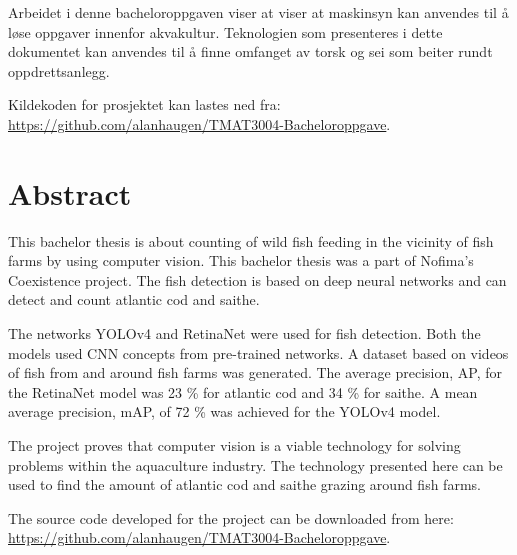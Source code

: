 Arbeidet i denne bacheloroppgaven viser at viser at maskinsyn kan anvendes til å løse oppgaver innenfor akvakultur. Teknologien som presenteres i dette dokumentet kan anvendes til å finne omfanget av torsk og sei som beiter rundt oppdrettsanlegg.%

Kildekoden for prosjektet kan lastes ned fra: \\ \url{https://github.com/alanhaugen/TMAT3004-Bacheloroppgave}.

\section*{Abstract}

This bachelor thesis is about counting  of wild fish feeding in the vicinity of fish farms by using computer vision. This bachelor thesis was a part of Nofima's Coexistence project. The fish detection is based on deep neural networks and can detect and count atlantic cod and saithe.

The networks YOLOv4 and RetinaNet were used for fish detection. Both the models used CNN concepts from pre-trained networks. A dataset based on videos of fish from and around fish farms was generated. The average precision, AP, for the RetinaNet model was 23 \% for atlantic cod and 34 \% for saithe. A mean average precision, mAP, of 72 \% was achieved for the YOLOv4 model.

The project proves that computer vision is a viable technology for solving problems within the aquaculture industry. The technology presented here can be used to find the amount of atlantic cod and saithe grazing around fish farms.

The source code developed for the project can be downloaded from here: \\ \url{https://github.com/alanhaugen/TMAT3004-Bacheloroppgave}.




